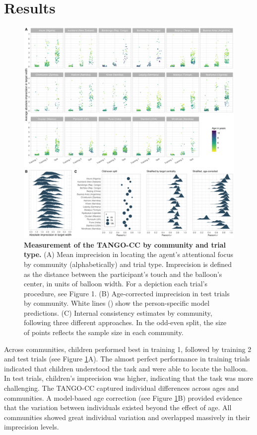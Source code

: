 \documentclass[
  man,mask,floatsintext]{apa7}
\begin{document}
\hypertarget{results}{%
\section{Results}\label{results}}



\begin{figure}

{\centering \includegraphics[width=1\linewidth]{../figures/tango-cc-results} 

}

\caption{\textbf{Measurement of the TANGO-CC by community and trial type.} (A) Mean imprecision in locating the agent's attentional focus by community (alphabetically) and trial type. Imprecision is defined as the distance between the participant's touch and the balloon's center, in units of balloon width. For a depiction each trial's procedure, see Figure 1. (B) Age-corrected imprecision in test trials by community. White lines (\textbar) show the person-specific model predictions. (C) Internal consistency estimates by community, following three different approaches. In the odd-even split, the size of points reflects the sample size in each community.}\label{fig:fig2}
\end{figure}

Across communities, children performed best in training 1, followed by training 2 and test trials (see Figure \ref{fig:fig2}A). The almost perfect performance in training trials indicated that children understood the task and were able to locate the balloon. In test trials, children's imprecision was higher, indicating that the task was more challenging. The TANGO-CC captured individual differences across ages and communities. A model-based age correction (see Figure \ref{fig:fig2}B) provided evidence that the variation between individuals existed beyond the effect of age. All communities showed great individual variation and overlapped massively in their imprecision levels.
\end{document}
